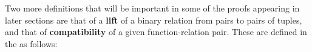 \documentclass[a4paper,UKenglish,cleveref, autoref, thm-restate]{lipics-v2019}
\begin{document}
Two more definitions that will be important in some of the proofs appearing in later sections are that of a \textbf{lift} of a binary relation from pairs to pairs of tuples, and that of \textbf{compatibility} of a given function-relation pair. These are defined in the \agdaualib as follows:
\begin{code}\>[0]\AgdaSpace{}%
\AgdaSymbol{:}
\>[10]\AgdaSymbol{\{}\AgdaSpace{}%
\AgdaSymbol{:}\AgdaSpace{}%
\AgdaSpace{}%
\AgdaSpace{}%
\AgdaSymbol{\}}\AgdaSpace{}%
\AgdaSymbol{\{}\AgdaSpace{}%
\AgdaSymbol{:}\AgdaSpace{}%
\AgdaSpace{}%
\AgdaSpace{}%
\AgdaSymbol{\}}\<%
\\
\>[0][@{}l@{\AgdaIndent{0}}]%
\>[1]%
\>[10]\AgdaSpace{}%
\AgdaSpace{}%
\AgdaSpace{}%
\AgdaSpace{}%
\AgdaSymbol{(}\AgdaSpace{}%
\AgdaSpace{}%
\AgdaSymbol{)}\AgdaSpace{}%
\AgdaSpace{}%
\AgdaSymbol{(}\AgdaSpace{}%
\AgdaSpace{}%
\AgdaSymbol{)}\<%
\\
\>[0][@{}l@{\AgdaIndent{0}}]%
\>[1]%
\>[10]\AgdaSpace{}%
\AgdaSpace{}%
\AgdaSpace{}%
\<%
\\
\>[0]\AgdaSpace{}%
\AgdaSpace{}%
\AgdaSpace{}%
\AgdaSpace{}%
\AgdaSymbol{=}\AgdaSpace{}%
\AgdaSpace{}%
\AgdaSpace{}%
\AgdaSpace{}%
\AgdaSpace{}%
\AgdaSymbol{(}\AgdaSpace{}%
\AgdaSymbol{)}\AgdaSpace{}%
\AgdaSymbol{(}\AgdaSpace{}%
\AgdaSymbol{)}\<%
\end{code}
\end{document}
